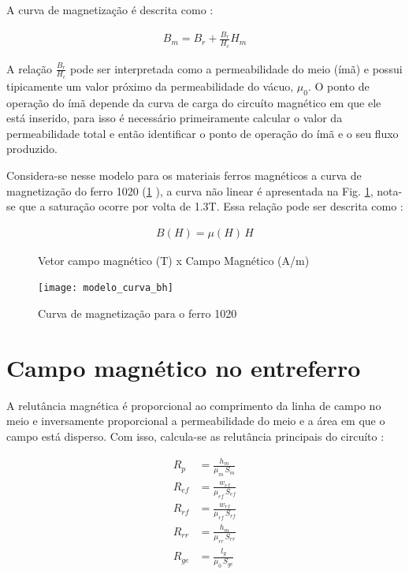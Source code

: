 A curva de magnetização é descrita como :

\begin{align}
B_m = B_r + \frac{B_r}{H_c} H_m
\label{eq:p:ima}
\end{align}

A relação $\frac{B_r}{H_c}$ pode ser interpretada como a permeabilidade do meio (ímã) e possui tipicamente um valor próximo da permeabilidade do vácuo, $\mu_0$. O ponto de operação do ímã depende da curva de carga do circuíto magnético em que ele está inserido, para isso é necessário primeiramente calcular o valor da permeabilidade total e então identificar o ponto de operação do ímã e o seu fluxo produzido.

Considera-se nesse modelo para os materiais ferros magnéticos a curva de magnetização do ferro 1020 (\ref{} ), a curva não linear é apresentada na Fig. \ref{Fig:Modelagem:BH}, nota-se que a saturação ocorre por volta de 1.3T. Essa relação pode ser descrita como :

\begin{align}
B(H) = \mu(H) \, H
\label{eq:p:BH:ferro}
\end{align}

\begin{figure}[!ht]
	\centering
	\caption*{ Vetor campo magnético (T) x Campo Magnético (A/m)}
	\texttt{[image: modelo\_curva\_bh]}
	\caption{Curva de magnetização para o ferro 1020}
	\label{Fig:Modelagem:BH}
\end{figure}


\section{Campo magnético no entreferro}

A relutância magnética é proporcional ao comprimento da linha de campo no meio e inversamente proporcional a permeabilidade do meio e a área em que o campo está disperso. Com isso, calcula-se as relutância principais do circuíto :

\begin{align}
R_{p}  &= \frac{h_m}{\mu_m \, S_m}			\\
R_{ef} &= \frac{w_{ef}}{\mu_{ef}\, S_{ef}}  \\     
R_{rf} &= \frac{w_{rf}}{\mu_{rf}\, S_{rf}}   \\    
R_{rr} &= \frac{h_m}{\mu_{rr} \, S_{rr}}     \\      
R_{ge} &= \frac{l_g}{\mu_0  \, S_{ge}}        
\end{align}

